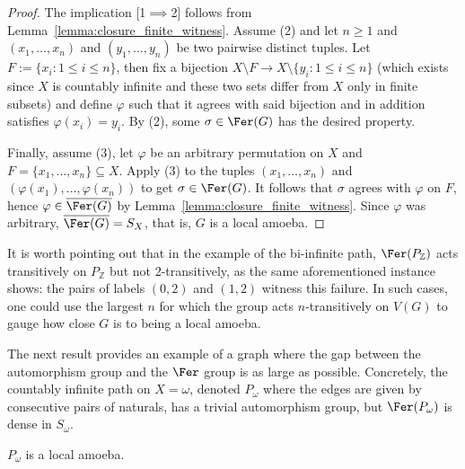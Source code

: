 \begin{proof}
    The implication [1$\implies$2] follows from Lemma~\ref{lemma:closure_finite_witness}.
    Assume (2) and let $n\geq1$ and $(x_1,\dots,x_n)$ and $(y_1,\dots,y_n)$ be two pairwise distinct tuples.
    Let $F:=\{x_i:1\leq i\leq n\}$, then fix a bijection $X\setminus F\to X\setminus\{y_i:1\leq i\leq n\}$ (which exists since $X$ is countably infinite and these two sets differ from $X$ only in finite subsets) and define $\varphi$ such that it agrees with said bijection and in addition satisfies $\varphi(x_i)=y_i$.
    By (2), some $\sigma\in\Fer(G)$ has the desired property.

    Finally, assume (3), let $\varphi$ be an arbitrary permutation on $X$ and $F=\{x_1,\dots,x_n\}\subseteq X$.
    Apply (3) to the tuples $(x_1,\dots,x_n)$ and $(\varphi(x_1),\dots,\varphi(x_n))$ to get $\sigma\in\Fer(G)$.
    It follows that $\sigma$ agrees with $\varphi$ on $F$, hence $\varphi\in\overline{\Fer(G)}$ by Lemma~\ref{lemma:closure_finite_witness}.
    Since $\varphi$ was arbitrary, $\overline{\Fer(G)}=S_X$, that is, $G$ is a local amoeba.
\end{proof}

It is worth pointing out that in the example of the bi-infinite path, $\Fer(P_\mathbb Z)$ acts transitively on $P_\mathbb Z$ but not 2-transitively, as the same aforementioned instance shows: the pairs of labels $(0,2)$ and $(1,2)$ witness this failure.
In such cases, one could use the largest $n$ for which the group acts $n$-transitively on $V(G)$ to gauge how close $G$ is to being a local amoeba.

The next result provides an example of a graph where the gap between the automorphism group and the $\Fer$ group is as large as possible.
Concretely, the countably infinite path on $X=\omega$, denoted $P_\omega$ where the edges are given by consecutive pairs of naturals, has a trivial automorphism group, but $\Fer(P_\omega)$ is dense in $S_\omega$.

\begin{proposition}\label{prop:p_omega_local}
    $P_\omega$ is a local amoeba.
\end{proposition}


